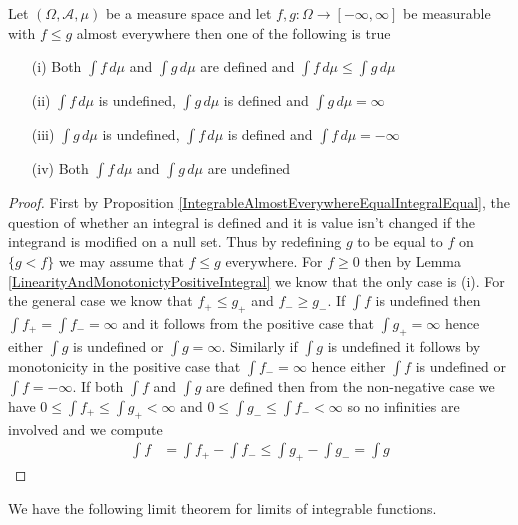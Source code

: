 \begin{prop}\label{SignedIntegralMonotonicity}Let $(\Omega, \mathcal{A}, \mu)$ be a measure space and let $f,g: \Omega \to [-\infty, \infty]$ be measurable with
$f \leq g$ almost everywhere then one of the following is true
\begin{itemize}
\item[(i)]Both $\int f \, d\mu$ and $\int g \, d\mu$ are defined and $\int f \, d\mu \leq \int g \, d\mu$
\item[(ii)]$\int f \, d\mu$ is undefined, $\int g \, d\mu$ is defined and $\int g \, d\mu = \infty$
\item[(iii)]$\int g \, d\mu$ is undefined, $\int f \, d\mu$ is defined and $\int f \, d\mu = -\infty$
\item[(iv)]Both $\int f \, d\mu$ and $\int g \, d\mu$ are undefined
\end{itemize}
\end{prop}
\begin{proof}
First by Proposition \ref{IntegrableAlmostEverywhereEqualIntegralEqual}, the question of whether an integral is defined and it is value isn't changed if the integrand is modified on a null set.  Thus by redefining $g$ to be equal to $f$ on $\lbrace g < f \rbrace$ we may assume that $f \leq g$ everywhere.
For $f \geq 0$ then by Lemma \ref{LinearityAndMonotonictyPositiveIntegral} we know that the only case is (i).  For the general case we know that $f_+ \leq g_+$ and $f_- \geq g_-$.  If $\int f$ is undefined then $\int f_+ = \int f_- = \infty$ and it follows from the positive case that $\int g_+ = \infty$ hence either $\int g$ is undefined or $\int g = \infty$.  Similarly if $\int g$ is undefined it follows by monotonicity in the positive case that $\int f_- = \infty$ hence either $\int f$ is undefined or $\int f = -\infty$.  If both $\int f$ and $\int g$ are defined then from the non-negative case we have $0 \leq \int f_+  \leq \int g_+ < \infty$ and $0 \leq \int g_- \leq \int f_- < \infty$ so no infinities are involved and we compute
\begin{align*}
\int f  &= \int f_+ - \int f_- \leq \int g_+ - \int g_- = \int g
\end{align*}
\end{proof}

We have the following limit theorem for limits of integrable
functions.

